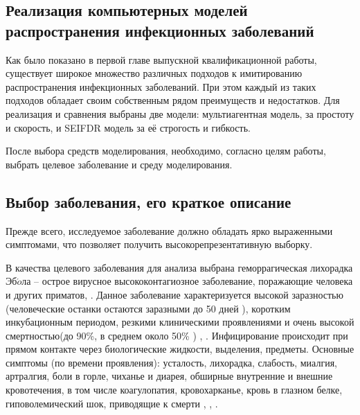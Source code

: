\newpage
\parindent=1cm %
\begin{center}
		
		\section{Реализация компьютерных моделей распространения инфекционных заболеваний}
		
\end{center}

Как было показано в первой главе выпускной квалификационной работы, существует широкое множество различных подходов к имитированию распространения инфекционных заболеваний. При этом каждый из таких подходов обладает своим собственным рядом преимуществ и недостатков. Для реализация и сравнения выбраны две модели: мультиагентная модель, за простоту и скорость, и SEIFDR модель за её строгость и гибкость.

После выбора средств моделирования, необходимо, согласно целям работы, выбрать целевое заболевание и среду моделирования.


\subsection{Выбор заболевания, его краткое описание}
Прежде всего, исследуемое заболевание должно обладать ярко выраженными симптомами, что позволяет получить высокорепрезентативную  выборку.


В качества целевого заболевания для анализа выбрана геморрагическая лихорадка Эб$\acute{o}$ла -- острое вирусное высококонтагиозное заболевание, поражающие человека и других приматов, . Данное заболевание характеризуется высокой заразностью (человеческие останки остаются заразными до 50 дней 
\cite{CDC:2014:1}), коротким инкубационным периодом, резкими клиническими проявлениями и очень высокой смертностью(до 90\%, в среднем около 50\% ) \cite{WHO:2018:1}, \cite[с. 444]{Sunit:2014}. %
Инфицирование происходит при прямом контакте через биологические жидкости, выделения, предметы. Основные симптомы (по времени проявления):  усталость, лихорадка, слабость, миалгия,  артралгия, боли в горле, чиханье и диарея,  обширные внутренние и внешние кровотечения, в том числе коагулопатия, кровохарканье, кровь в глазном белке, гиповолемический шок, приводящие к смерти \cite{ncbi:2011}, \cite{ovid:2016}, \cite{Springer:2015}  . 

